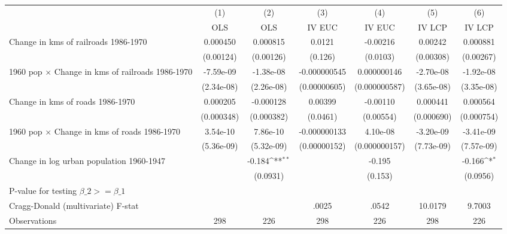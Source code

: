 {
\def\sym#1{\ifmmode^{#1}\else\(^{#1}\)\fi}
\begin{tabular}{l*{6}{c}}
\hline\hline
                &\multicolumn{1}{c}{(1)}&\multicolumn{1}{c}{(2)}&\multicolumn{1}{c}{(3)}&\multicolumn{1}{c}{(4)}&\multicolumn{1}{c}{(5)}&\multicolumn{1}{c}{(6)}\\
                &\multicolumn{1}{c}{OLS}&\multicolumn{1}{c}{OLS}&\multicolumn{1}{c}{IV EUC}&\multicolumn{1}{c}{IV EUC}&\multicolumn{1}{c}{IV LCP}&\multicolumn{1}{c}{IV LCP}\\
\hline
Change in kms of railroads 1986-1970& 0.000450         & 0.000815         &   0.0121         & -0.00216         &  0.00242         & 0.000881         \\
                &(0.00124)         &(0.00126)         &  (0.126)         & (0.0103)         &(0.00308)         &(0.00267)         \\
[1em]
1960 pop $\times$ Change in kms of railroads 1986-1970&-7.59e-09         &-1.38e-08         &-0.000000545         &0.000000146         &-2.70e-08         &-1.92e-08         \\
                &(2.34e-08)         &(2.26e-08)         &(0.00000605)         &(0.000000587)         &(3.65e-08)         &(3.35e-08)         \\
[1em]
Change in kms of roads 1986-1970& 0.000205         &-0.000128         &  0.00399         & -0.00110         & 0.000441         & 0.000564         \\
                &(0.000348)         &(0.000382)         & (0.0461)         &(0.00554)         &(0.000690)         &(0.000754)         \\
[1em]
1960 pop $\times$ Change in kms of roads 1986-1970& 3.54e-10         & 7.86e-10         &-0.000000133         & 4.10e-08         &-3.20e-09         &-3.41e-09         \\
                &(5.36e-09)         &(5.32e-09)         &(0.00000152)         &(0.000000157)         &(7.73e-09)         &(7.57e-09)         \\
[1em]
Change in log urban population 1960-1947&                  &   -0.184\sym{**} &                  &   -0.195         &                  &   -0.166\sym{*}  \\
                &                  & (0.0931)         &                  &  (0.153)         &                  & (0.0956)         \\
\hline
P-value for testing $\beta\_{2} >= \beta\_{1}$&                  &                  &                  &                  &                  &                  \\
Cragg-Donald (multivariate) F-stat&                  &                  &    .0025         &    .0542         &  10.0179         &   9.7003         \\
Observations    &      298         &      226         &      298         &      226         &      298         &      226         \\
\hline\hline
\end{tabular}
}
